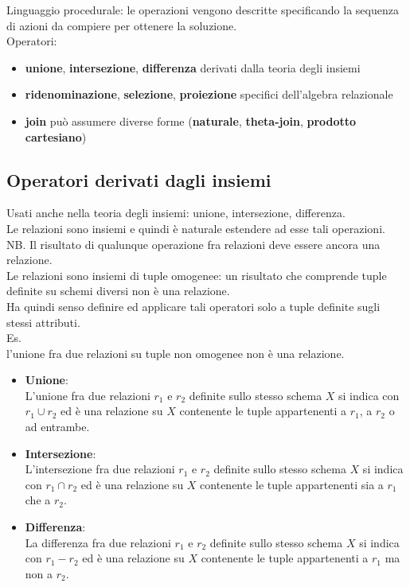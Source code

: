 \documentclass[../main.tex]{subfiles}
\begin{document}
	Linguaggio procedurale: le operazioni vengono descritte specificando la sequenza di azioni da compiere per ottenere la soluzione.\\
	Operatori:
	\begin{itemize}
		\item \textbf{unione}, \textbf{intersezione}, \textbf{differenza} derivati dalla teoria degli insiemi
		\item \textbf{ridenominazione}, \textbf{selezione}, \textbf{proiezione} specifici dell’algebra relazionale
		\item \textbf{join} può assumere diverse forme (\textbf{naturale}, \textbf{theta-join}, \textbf{prodotto cartesiano})
	\end{itemize}
	\subsection{Operatori derivati dagli insiemi}
	Usati anche nella teoria degli insiemi: unione, intersezione, differenza.\\
	Le relazioni sono insiemi e quindi è naturale estendere ad esse tali operazioni.\\
	NB. Il risultato di qualunque operazione fra relazioni deve essere ancora una relazione.\\
	Le relazioni sono insiemi di tuple omogenee: un risultato che comprende tuple definite su schemi diversi non è una relazione.\\
	Ha quindi senso definire ed applicare tali operatori solo a tuple definite sugli stessi attributi.\\
	Es.\\
	l’unione fra due relazioni su tuple non omogenee non è una relazione.\\
	\begin{itemize}
		\item \textbf{Unione}: \\
		L’unione fra due relazioni $r_1$ e $r_2$ definite sullo stesso schema $X$ si indica con $r_1 \cup r_2$ ed è una relazione su $X$ contenente le tuple appartenenti a $r_1$, a $r_2$ o ad entrambe.
		\item \textbf{Intersezione}:\\
		L’intersezione fra due relazioni $r_1$ e $r_2$ definite sullo stesso schema $X$ si indica con $r_1 \cap r_2$
		ed è una relazione su $X$ contenente le tuple appartenenti sia a $r _1$ che a $r_2$.
		\item \textbf{Differenza}:\\
		La differenza fra due relazioni $r_1$ e  $r _2$ definite sullo stesso schema $X$ si indica con $r_1 - r_2$ ed è una relazione su $X$ contenente le tuple appartenenti a $r_1$ ma non a $r_2$.
	\end{itemize}
\end{document}
